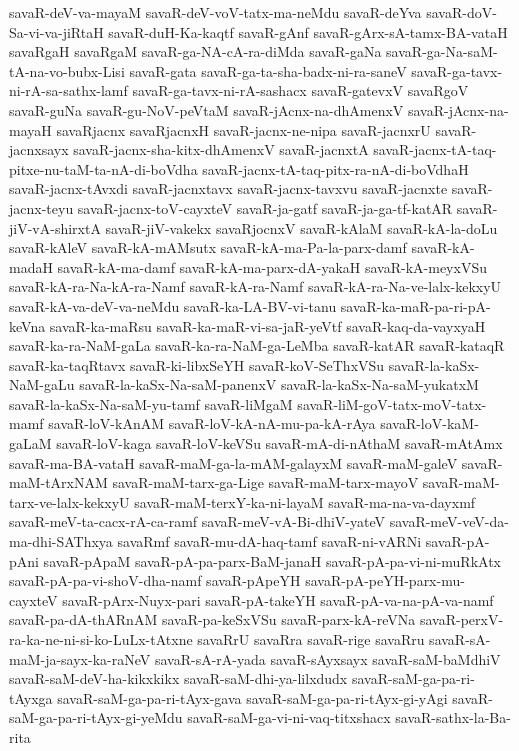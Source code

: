 {savaR-deV-va-mayaM
savaR-deV-voV-tatx-ma-neMdu
savaR-deYva
savaR-doV-Sa-vi-va-jiRtaH
savaR-duH-Ka-kaqtf
savaR-gAnf
savaR-gArx-sA-tamx-BA-vataH
savaRgaH
savaRgaM
savaR-ga-NA-cA-ra-diMda
savaR-gaNa
savaR-ga-Na-saM-tA-na-vo-bubx-Lisi
savaR-gata
savaR-ga-ta-sha-badx-ni-ra-saneV
savaR-ga-tavx-ni-rA-sa-sathx-lamf
savaR-ga-tavx-ni-rA-sashacx
savaR-gatevxV
savaRgoV
savaR-guNa
savaR-gu-NoV-peVtaM
savaR-jAcnx-na-dhAmenxV
savaR-jAcnx-na-mayaH
savaRjacnx
savaRjacnxH
savaR-jacnx-ne-nipa
savaR-jacnxrU
savaR-jacnxsayx
savaR-jacnx-sha-kitx-dhAmenxV
savaR-jacnxtA
savaR-jacnx-tA-taq-pitxe-nu-taM-ta-nA-di-boVdha
savaR-jacnx-tA-taq-pitx-ra-nA-di-boVdhaH
savaR-jacnx-tAvxdi
savaR-jacnxtavx
savaR-jacnx-tavxvu
savaR-jacnxte
savaR-jacnx-teyu
savaR-jacnx-toV-cayxteV
savaR-ja-gatf
savaR-ja-ga-tf-katAR
savaR-jiV-vA-shirxtA
savaR-jiV-vakekx
savaRjocnxV
savaR-kAlaM
savaR-kA-la-doLu
savaR-kAleV
savaR-kA-mAMsutx
savaR-kA-ma-Pa-la-parx-damf
savaR-kA-madaH
savaR-kA-ma-damf
savaR-kA-ma-parx-dA-yakaH
savaR-kA-meyxVSu
savaR-kA-ra-Na-kA-ra-Namf
savaR-kA-ra-Namf
savaR-kA-ra-Na-ve-lalx-kekxyU
savaR-kA-va-deV-va-neMdu
savaR-ka-LA-BV-vi-tanu
savaR-ka-maR-pa-ri-pA-keVna
savaR-ka-maRsu
savaR-ka-maR-vi-sa-jaR-yeVtf
savaR-kaq-da-vayxyaH
savaR-ka-ra-NaM-gaLa
savaR-ka-ra-NaM-ga-LeMba
savaR-katAR
savaR-kataqR
savaR-ka-taqRtavx
savaR-ki-libxSeYH
savaR-koV-SeThxVSu
savaR-la-kaSx-NaM-gaLu
savaR-la-kaSx-Na-saM-panenxV
savaR-la-kaSx-Na-saM-yukatxM
savaR-la-kaSx-Na-saM-yu-tamf
savaR-liMgaM
savaR-liM-goV-tatx-moV-tatx-mamf
savaR-loV-kAnAM
savaR-loV-kA-nA-mu-pa-kA-rAya
savaR-loV-kaM-gaLaM
savaR-loV-kaga
savaR-loV-keVSu
savaR-mA-di-nAthaM
savaR-mAtAmx
savaR-ma-BA-vataH
savaR-maM-ga-la-mAM-galayxM
savaR-maM-galeV
savaR-maM-tArxNAM
savaR-maM-tarx-ga-Lige
savaR-maM-tarx-mayoV
savaR-maM-tarx-ve-lalx-kekxyU
savaR-maM-terxY-ka-ni-layaM
savaR-ma-na-va-dayxmf
savaR-meV-ta-cacx-rA-ca-ramf
savaR-meV-vA-Bi-dhiV-yateV
savaR-meV-veV-da-ma-dhi-SAThxya
savaRmf
savaR-mu-dA-haq-tamf
savaR-ni-vARNi
savaR-pA-pAni
savaR-pApaM
savaR-pA-pa-parx-BaM-janaH
savaR-pA-pa-vi-ni-muRkAtx
savaR-pA-pa-vi-shoV-dha-namf
savaR-pApeYH
savaR-pA-peYH-parx-mu-cayxteV
savaR-pArx-Nuyx-pari
savaR-pA-takeYH
savaR-pA-va-na-pA-va-namf
savaR-pa-dA-thARnAM
savaR-pa-keSxVSu
savaR-parx-kA-reVNa
savaR-perxV-ra-ka-ne-ni-si-ko-LuLx-tAtxne
savaRrU
savaRra
savaR-rige
savaRru
savaR-sA-maM-ja-sayx-ka-raNeV
savaR-sA-rA-yada
savaR-sAyxsayx
savaR-saM-baMdhiV
savaR-saM-deV-ha-kikxkikx
savaR-saM-dhi-ya-lilxdudx
savaR-saM-ga-pa-ri-tAyxga
savaR-saM-ga-pa-ri-tAyx-gava
savaR-saM-ga-pa-ri-tAyx-gi-yAgi
savaR-saM-ga-pa-ri-tAyx-gi-yeMdu
savaR-saM-ga-vi-ni-vaq-titxshacx
savaR-sathx-la-Ba-rita
}
